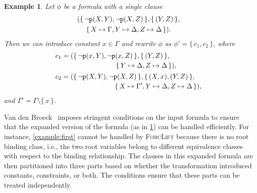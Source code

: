 \documentclass{article}
\newtheorem{example}{Example}
\newcommand{\predicate}{\texttt{\textup{p}}}
\begin{document}
\begin{example}\label{example:dr}
  Let $\phi$ be a formula with a single clause
  \begin{multline*}
    (\{\, \neg \predicate(X, Y), \neg \predicate(X, Z) \,\}, \{\, (Y, Z) \,\}, \\
    \{\, X \mapsto \Gamma, Y \mapsto \Delta, Z \mapsto \Delta \,\}).
  \end{multline*}
  Then we can introduce constant $x \in \Gamma$ and rewrite $\phi$ as
  $\phi' = \{\, c_{1}, c_{2} \,\}$, where
  \begin{align*}
    c_{1} &= \begin{multlined}[t]
      (\{\, \neg \predicate(x, Y), \neg \predicate(x, Z) \,\}, \{\, (Y, Z) \,\}, \\
      \{\, Y \mapsto \Delta, Z \mapsto \Delta \,\}),
      \end{multlined}\\
    c_{2} &= \begin{multlined}[t]
      (\{\, \neg \predicate(X, Y), \neg \predicate(X, Z) \,\}, \{\, (X, x), (Y, Z) \,\}, \\
      \{\, X \mapsto \Gamma', Y \mapsto \Delta, Z \mapsto \Delta \,\}),
      \end{multlined}
  \end{align*}
  and $\Gamma' = \Gamma \setminus \{\, x \,\}$.
\end{example}

Van den Broeck~ imposes stringent conditions
on the input formula to ensure that the expanded version of the formula (as in
\cref{example:dr}) can be handled efficiently. For instance,
\cref{example:first} cannot be handled by \textsc{ForcLift} because there is no
root binding class, i.e., the two root variables belong to different equivalence
classes with respect to the binding relationship. The clauses in this expanded
formula are then partitioned into three parts based on whether the
transformation introduced constants, constraints, or both. The conditions ensure
that these parts can be treated independently.
\end{document}
